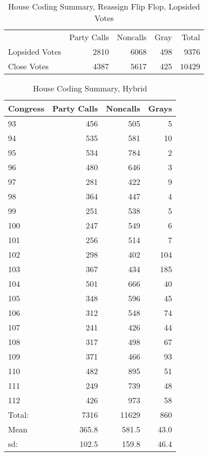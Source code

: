 \documentclass[12pt]{article}
\begin{document}
\begin{table}
	\caption{House Coding Summary, Reassign Flip Flop, Lopsided Votes}
	\centering
	\begin{tabular}{lrrrr}
		\hline
		& Party Calls & Noncalls & Gray & Total \\
		Lopsided Votes & 2810 & 6068 & 498 & 9376 \\
		Close Votes & 4387 & 5617 & 425  & 10429 \\
		\hline
		
	\end{tabular}
\end{table}

\begin{table}[H]
	\caption{House Coding Summary, Hybrid}
	\centering
	\begin{tabular}{lrrr}
		\hline
		Congress & Party Calls & Noncalls & Grays \\ 
		\hline
		93 & 456 & 505 &   5 \\ 
		94 & 535 & 581 &  10 \\ 
		95 & 534 & 784 &   2 \\ 
		96 & 480 & 646 &   3 \\ 
		97 & 281 & 422 &   9 \\ 
		98 & 364 & 447 &   4 \\ 
		99 & 251 & 538 &   5 \\ 
		100 & 247 & 549 &   6 \\ 
		101 & 256 & 514 &   7 \\ 
		102 & 298 & 402 & 104 \\ 
		103 & 367 & 434 & 185 \\ 
		104 & 501 & 666 &  40 \\ 
		105 & 348 & 596 &  45 \\ 
		106 & 312 & 548 &  74 \\ 
		107 & 241 & 426 &  44 \\ 
		108 & 317 & 498 &  67 \\ 
		109 & 371 & 466 &  93 \\ 
		110 & 482 & 895 &  51 \\ 
		111 & 249 & 739 &  48 \\ 
		112 & 426 & 973 &  58 \\  
		\hline
		Total: & 7316 & 11629 & 860 \\
		Mean & 365.8 & 581.5 & 43.0 \\
		sd: & 102.5 & 159.8 & 46.4 \\
		\hline
	\end{tabular}
\end{table}
\end{document}
